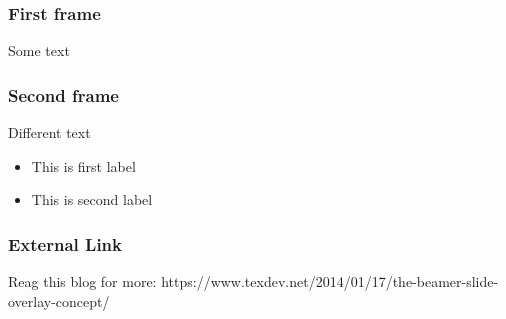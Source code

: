 \documentclass{beamer}
\begin{document}
	\begin{frame}
		\frametitle{First frame}
		Some text
	\end{frame}
	
	\begin{frame}
		\frametitle{Second frame}
		Different text
		\begin{itemize}
			\item<1->[lbl1] This is first label
			\item<2->[lbl2] This is second label
		\end{itemize}
	\end{frame}
	
	\begin{frame}
		\frametitle{External Link}
		Reag this blog for more: https://www.texdev.net/2014/01/17/the-beamer-slide-overlay-concept/
	\end{frame}
\end{document}
